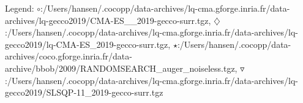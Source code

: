 Legend: {\color{NavyBlue}$\circ$}:/Users/hansen/.cocopp/data-archives/lq-cma.gforge.inria.fr/data-archives/lq-gecco2019/CMA-ES\_\_2019-gecco-surr.tgz, {\color{Magenta}$\diamondsuit$}:/Users/hansen/.cocopp/data-archives/lq-cma.gforge.inria.fr/data-archives/lq-gecco2019/lq-CMA-ES\_2019-gecco-surr.tgz, {\color{Orange}$\star$}:/Users/hansen/.cocopp/data-archives/coco.gforge.inria.fr/data-archive/bbob/2009/RANDOMSEARCH\_auger\_noiseless.tgz, {\color{CornflowerBlue}$\triangledown$}:/Users/hansen/.cocopp/data-archives/lq-cma.gforge.inria.fr/data-archives/lq-gecco2019/SLSQP-11\_2019-gecco-surr.tgz